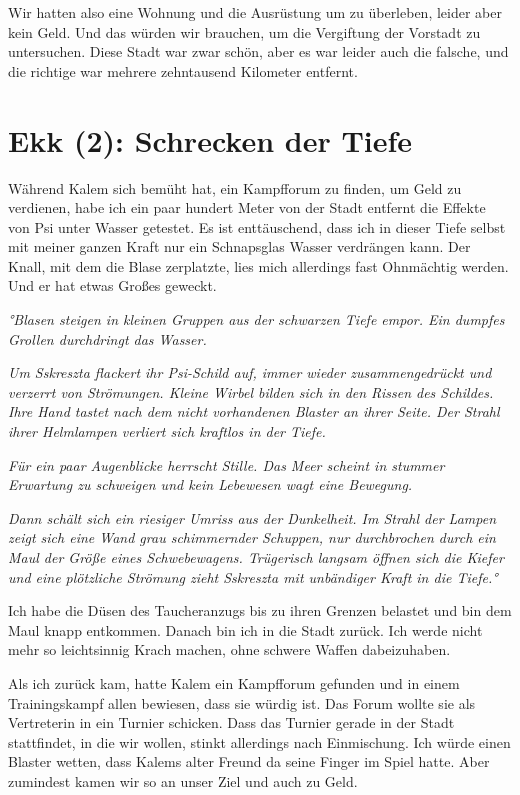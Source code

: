 \documentclass[11pt]{scrartcl}
\begin{document}
Wir hatten also eine Wohnung und die Ausrüstung um zu überleben, leider
aber kein Geld. Und das würden wir brauchen, um die Vergiftung der
Vorstadt zu untersuchen. Diese Stadt war zwar schön, aber es war leider
auch die falsche, und die richtige war mehrere zehntausend Kilometer
entfernt.

\section{Ekk (2): Schrecken der Tiefe}

Während Kalem sich bemüht hat, ein Kampfforum zu finden, um Geld zu
verdienen, habe ich ein paar hundert Meter von der Stadt entfernt die
Effekte von Psi unter Wasser getestet. Es ist enttäuschend, dass ich in
dieser Tiefe selbst mit meiner ganzen Kraft nur ein Schnapsglas Wasser
verdrängen kann. Der Knall, mit dem die Blase zerplatzte, lies mich
allerdings fast Ohnmächtig werden. Und er hat etwas Großes geweckt.

\emph{°Blasen steigen in kleinen Gruppen aus der schwarzen Tiefe empor.
Ein dumpfes Grollen durchdringt das Wasser.}

\emph{Um Sskreszta flackert ihr Psi-Schild auf, immer wieder
zusammengedrückt und verzerrt von Strömungen. Kleine Wirbel bilden sich
in den Rissen des Schildes. Ihre Hand tastet nach dem nicht vorhandenen
Blaster an ihrer Seite. Der Strahl ihrer Helmlampen verliert sich
kraftlos in der Tiefe.}

\emph{Für ein paar Augenblicke herrscht Stille. Das Meer scheint in
stummer Erwartung zu schweigen und kein Lebewesen wagt eine Bewegung.}

\emph{Dann schält sich ein riesiger Umriss aus der Dunkelheit. Im Strahl
der Lampen zeigt sich eine Wand grau schimmernder Schuppen, nur
durchbrochen durch ein Maul der Größe eines Schwebewagens. Trügerisch
langsam öffnen sich die Kiefer und eine plötzliche Strömung zieht
Sskreszta mit unbändiger Kraft in die Tiefe.°}

Ich habe die Düsen des Taucheranzugs bis zu ihren Grenzen belastet und
bin dem Maul knapp entkommen. Danach bin ich in die Stadt zurück. Ich
werde nicht mehr so leichtsinnig Krach machen, ohne schwere Waffen
dabeizuhaben.

Als ich zurück kam, hatte Kalem ein Kampfforum gefunden und in einem
Trainingskampf allen bewiesen, dass sie würdig ist. Das Forum wollte sie
als Vertreterin in ein Turnier schicken. Dass das Turnier gerade in der
Stadt stattfindet, in die wir wollen, stinkt allerdings nach
Einmischung. Ich würde einen Blaster wetten, dass Kalems alter Freund da
seine Finger im Spiel hatte. Aber zumindest kamen wir so an unser Ziel
und auch zu Geld.
\end{document}
